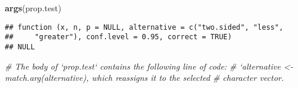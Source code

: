 \documentclass[
]{book}
\newenvironment{Shaded}{\begin{snugshade}}{\end{snugshade}}
\newcommand{\CommentTok}[1]{\textcolor[rgb]{0.56,0.35,0.01}{\textit{#1}}}
\newcommand{\KeywordTok}[1]{\textcolor[rgb]{0.13,0.29,0.53}{\textbf{#1}}}
\newcommand{\NormalTok}[1]{#1}
\begin{document}
\begin{Shaded}
\begin{Highlighting}[]
\KeywordTok{args}\NormalTok{(prop.test)}
\end{Highlighting}
\end{Shaded}

\begin{verbatim}
## function (x, n, p = NULL, alternative = c("two.sided", "less", 
##     "greater"), conf.level = 0.95, correct = TRUE) 
## NULL
\end{verbatim}

\begin{Shaded}
\begin{Highlighting}[]
\CommentTok{# The body of `prop.test` contains the following line of code:}
\CommentTok{# `alternative <- match.arg(alternative), which reassigns it to the selected}
\CommentTok{# character vector.}
\end{Highlighting}
\end{Shaded}
\end{document}
